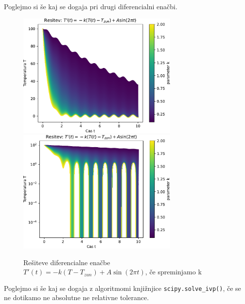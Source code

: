 Poglejmo si še kaj se dogaja pri drugi diferencialni enačbi.
\begin{figure}[h]
    \centering
    \includegraphics[width=8cm]{pdfs/T1(t,k).pdf}
    \includegraphics[width=8cm]{pdfs/T1(t,k)_log.pdf}

    \caption{Rešiteve diferencialne enačbe $T'(t) = -k(T-T_{zun}) + A\sin(2\pi t)$, če spreminjamo k}
\end{figure}
\newpage
Poglejmo si še kaj se dogaja z algoritmomi knjižnjice \verb|scipy.solve_ivp()|, če se ne dotikamo ne absolutne 
ne relativne tolerance.

